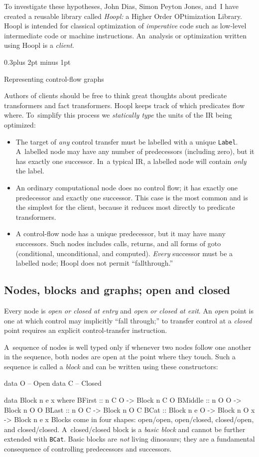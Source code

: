 \documentclass[twocolumn]{article}
\makeatletter
\newenvironment{code}{\par\unskip\kern-6pt \small\verbatim}{\endverbatim}
\newcommand\mysection[1]{%
  \par
  \vskip 0.5\baselineskip plus 2pt minus 1pt
  \noindent{\raggedright\textbf{#1}}
  \par
  \vskip 0.3\baselineskip plus 2pt minus 1pt
  \@afterindentfalse
}
\renewcommand\mysection[1]{%
  \@startsection{section}{1}{\z@}{-0.5\baselineskip plus -2pt minus -1pt}%
                                   {0.3\baselineskip plus 2pt minus 1pt}%
           {\normalfont\raggedright\bfseries}}
\makeatother
\begin{document}
To investigate these hypotheses, John Dias, Simon Peyton Jones, and~I
have created a reusable library called \emph{Hoopl:} a Higher Order
OPtimization Library.
Hoopl is intended for classical optimization of \emph{imperative} code
such as low-level intermediate code or machine instructions.
An~analysis or optimization written using Hoopl is a \emph{client}.

\mysection*{Representing control-flow graphs}

Authors of clients should be free to think great thoughts about
predicate transformers and fact transformers.
Hoopl keeps track of which predicates flow where.
To~simplify this process we \emph{statically type} the units of the IR
being optimized:
\begin{itemize}
\item
The target of \emph{any} control transfer must be labelled with a
unique \texttt{Label}.
A~labelled node may have any number of predecessors (including zero),
but it has exactly one successor.
In~a typical IR, a labelled node will contain \emph{only} the label.
\item
An ordinary computational node does no control flow; it has
exactly one predecessor and exactly one successor.
This case is the most common and is the simplest for the client,
because it reduces most directly to predicate transformers.
\item
A control-flow node has a unique predecessor, but it may have many
successors.
Such nodes includes calls, returns, and all forms of goto
(conditional, unconditional, and computed).
\emph{Every} successor must be a labelled node; Hoopl does not permit
``fallthrough.''
\end{itemize}

\subsection{Nodes, blocks and graphs; open and closed}

Every node is \emph{open or closed at entry}
and \emph{open or closed at exit}.  
An \emph{open} point is one at which control may implicitly ``fall through;''
to transfer control at a \emph{closed} point requires an explicit
control-transfer instruction.

A~sequence of nodes is well typed only if whenever two nodes follow
one another in the sequence, both nodes are open at the point where
they touch.
Such a sequence is called a \emph{block} and can be written using
these constructors:
\begin{code}
data O   -- Open
data C   -- Closed

data Block n e x where
 BFirst  :: n C O                      -> Block n C O
 BMiddle :: n O O                      -> Block n O O
 BLast   :: n O C                      -> Block n O C
 BCat    :: Block n e O -> Block n O x -> Block n e x
\end{code}
Blocks come in four shapes: open/open, open/closed, closed/open, and
closed/closed.
A~closed/closed block is a \emph{basic block} and cannot be further
extended with \texttt{BCat}.
Basic blocks are \emph{not} living dinosaurs; they are a fundamental
consequence of controlling predecessors and successors.
\end{document}
